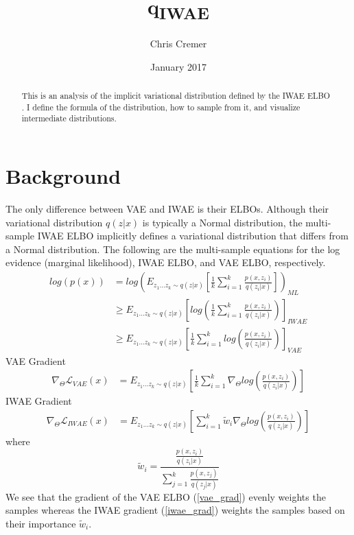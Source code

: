 \documentclass{article}
\title{q\textsubscript{IWAE}}
\author{Chris Cremer}
\date{January 2017}
\begin{document}
\maketitle


\begin{abstract}
This is an analysis of the implicit variational distribution defined by the IWAE ELBO \cite{burda2015importance}. I define the formula of the distribution, how to sample from it, and visualize intermediate distributions.
\end{abstract}





\section{Background}
The only difference between VAE and IWAE is their ELBOs. Although their variational distribution $q(z|x)$ is typically a Normal distribution, the multi-sample IWAE ELBO implicitly defines a variational distribution that differs from a Normal distribution. The following are the multi-sample equations for the log evidence (marginal likelihood), IWAE ELBO, and VAE ELBO, respectively. 
\begin{align} 
    log(p(x)) &=  log\left(E_{z_{1}...z_{k} \sim q(z|x)} \left[  \frac{1}{k}\sum_{i=1}^k \frac{p(x,z_i)}{q(z_i|x)}    \right]   \right)_{ML}
    \\
    & \geq E_{z_{1}...z_{k} \sim q(z|x)} \left[log\left(  \frac{1}{k}\sum_{i=1}^k \frac{p(x,z_i)}{q(z_i|x)}  \right)  \right]_{IWAE} \label{iwae_elbo}    \\
    & \geq E_{z_{1}...z_{k} \sim q(z|x)} \left[  \frac{1}{k}\sum_{i=1}^k log\left(\frac{p(x,z_i)}{q(z_i|x)}  \right)  \right]_{VAE} \label{vae_elbo}
\end{align}
VAE Gradient
\begin{align} 
    \nabla_{\Theta} \mathcal{L}_{VAE}(x) &= E_{z_{1}...z_{k} \sim q(z|x)} \left[ \frac{1}{k}  \sum_{i=1}^k  \nabla_{\Theta} log\left(\frac{p(x,z_i)}{q(z_i|x)}  \right)  \right] \label{vae_grad}
\end{align}
IWAE Gradient
\begin{align} 
    \nabla_{\Theta} \mathcal{L}_{IWAE}(x) &= E_{z_{1}...z_{k} \sim q(z|x)} \left[  \sum_{i=1}^k \tilde{w}_i \nabla_{\Theta} log\left(\frac{p(x,z_i)}{q(z_i|x)}  \right)  \right] \label{iwae_grad}
\end{align}
where $$\tilde{w}_i = \frac{\frac{p(x,z_i)}{q(z_i|x)}}{\sum_{j=1}^k \frac{p(x,z_j)}{q(z_j|x)}}$$
We see that the gradient of the VAE ELBO (\ref{vae_grad}) evenly weights the samples whereas the IWAE gradient (\ref{iwae_grad}) weights the samples based on their importance $\tilde{w}_i$.
\end{document}
